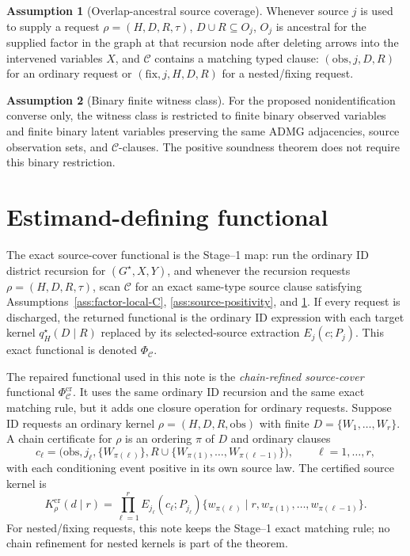 \documentclass[11pt]{article}
\theoremstyle{definition}
\newtheorem{assumption}{Assumption}
\theoremstyle{plain}
\theoremstyle{remark}
\begin{document}
\begin{assumption}[Overlap-ancestral source coverage]\label{ass:overlap-ancestral}
Whenever source \(j\) is used to supply a request
\(\rho=(H,D,R,\tau)\), \(D\cup R\subseteq O_j\), \(O_j\) is ancestral for the
supplied factor in the graph at that recursion node after deleting arrows
into the intervened variables \(X\), and \(\mathcal C\) contains a matching
typed clause: \((\mathrm{obs},j,D,R)\) for an ordinary request or
\((\mathrm{fix},j,H,D,R)\) for a nested/fixing request.
\end{assumption}

\begin{assumption}[Binary finite witness class]\label{ass:binary-witness}
For the proposed nonidentification converse only, the witness class is
restricted to finite binary observed variables and finite binary latent
variables preserving the same ADMG adjacencies, source observation sets, and
\(\mathcal C\)-clauses.  The positive soundness theorem does not require this
binary restriction.
\end{assumption}

\section{Estimand-defining functional}
The exact source-cover functional is the Stage--1 map: run the ordinary ID
district recursion for \((G^\star,X,Y)\), and whenever the recursion requests
\(\rho=(H,D,R,\tau)\), scan \(\mathcal C\) for an exact same-type source
clause satisfying Assumptions~\ref{ass:factor-local-C},
\ref{ass:source-positivity}, and \ref{ass:overlap-ancestral}.  If every
request is discharged, the returned functional is the ordinary ID expression
with each target kernel \(q^\star_H(D\mid R)\) replaced by its selected-source
extraction \(E_j(c;P_j)\).  This exact functional is denoted
\(\Phi_{\mathcal C}\).

The repaired functional used in this note is the \emph{chain-refined
source-cover} functional \(\Phi^{\mathrm{cr}}_{\mathcal C}\).  It uses the
same ordinary ID recursion and the same exact matching rule, but it adds one
closure operation for ordinary requests.  Suppose ID requests an ordinary
kernel \(\rho=(H,D,R,\mathrm{obs})\) with finite
\(D=\{W_1,\ldots,W_r\}\).  A chain certificate for \(\rho\) is an ordering
\(\pi\) of \(D\) and ordinary clauses
\[
  c_\ell=
  \bigl(\mathrm{obs},j_\ell,\{W_{\pi(\ell)}\},
        R\cup\{W_{\pi(1)},\ldots,W_{\pi(\ell-1)}\}\bigr),
  \qquad \ell=1,\ldots,r,
\]
with each conditioning event positive in its own source law.  The certified
source kernel is
\[
  K^{\mathrm{cr}}_\rho(d\mid r)
  =
  \prod_{\ell=1}^{r}
  E_{j_\ell}(c_\ell;P_{j_\ell})
  \{w_{\pi(\ell)}\mid r,w_{\pi(1)},\ldots,w_{\pi(\ell-1)}\}.
\]
For nested/fixing requests, this note keeps the Stage--1 exact matching rule;
no chain refinement for nested kernels is part of the theorem.
\end{document}

